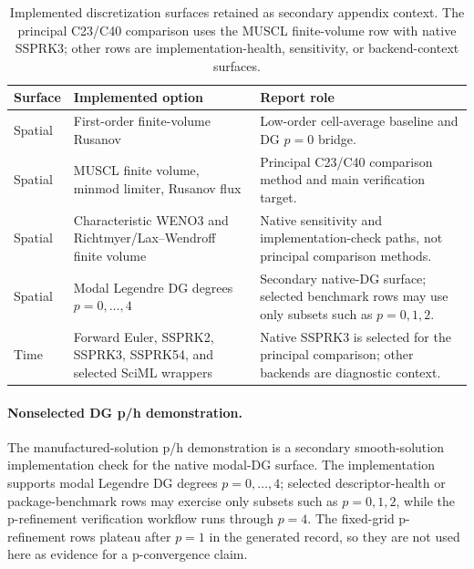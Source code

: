 \begin{table}[!htb]
    \centering
    \scriptsize
    \caption{Implemented discretization surfaces retained as secondary appendix context. The principal C23/C40 comparison uses the MUSCL finite-volume row with native SSPRK3; other rows are implementation-health, sensitivity, or backend-context surfaces.}
    \label{tab:implemented-discretization-surface}
    \begin{tabularx}{\textwidth}{@{}p{}p{}X@{}}
        \toprule
        \textbf{Surface} & \textbf{Implemented option} & \textbf{Report role} \\
        \midrule
        Spatial & First-order finite-volume Rusanov & Low-order cell-average baseline and DG $p=0$ bridge. \\
        Spatial & MUSCL finite volume, minmod limiter, Rusanov flux & Principal C23/C40 comparison method and main verification target. \\
        Spatial & Characteristic WENO3 and Richtmyer/Lax--Wendroff finite volume & Native sensitivity and implementation-check paths, not principal comparison methods. \\
        Spatial & Modal Legendre DG degrees $p=0,\ldots,4$ & Secondary native-DG surface; selected benchmark rows may use only subsets such as $p=0,1,2$. \\
        Time & Forward Euler, SSPRK2, SSPRK3, SSPRK54, and selected SciML wrappers & Native SSPRK3 is selected for the principal comparison; other backends are diagnostic context. \\
        \bottomrule
    \end{tabularx}
\end{table}

\paragraph{Nonselected DG p/h demonstration.}
The manufactured-solution p/h demonstration is a secondary smooth-solution
implementation check for the native modal-DG surface. The implementation
supports modal Legendre DG degrees $p=0,\ldots,4$; selected descriptor-health or
package-benchmark rows may exercise only subsets such as $p=0,1,2$, while the
p-refinement verification workflow runs through $p=4$. The fixed-grid
p-refinement rows plateau after $p=1$ in the generated record, so they are not
used here as evidence for a p-convergence claim.


